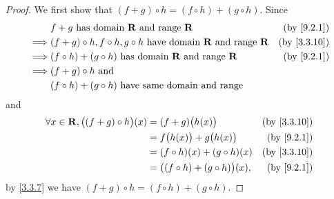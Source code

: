 \begin{proof}
  We first show that \((f + g) \circ h = (f \circ h) + (g \circ h)\).
  Since
  \begin{align*}
             & f + g \text{ has domain } \R \text{ and range } \R                                   & \text{(by \cref{9.2.1})}  \\
    \implies & (f + g) \circ h, f \circ h, g \circ h  \text{ have domain } \R \text{ and range } \R & \text{(by \cref{3.3.10})} \\
    \implies & (f \circ h) + (g \circ h)  \text{ has domain } \R \text{ and range } \R              & \text{(by \cref{9.2.1})}  \\
    \implies & (f + g) \circ h \text{ and }                                                                                     \\
             & (f \circ h) + (g \circ h) \text{ have same domain and range}
  \end{align*}
  and
  \begin{align*}
    \forall x \in \R, \big((f + g) \circ h\big)(x) & = (f + g)\big(h(x)\big)                   & \text{(by \cref{3.3.10})} \\
                                                   & = f\big(h(x)\big) + g\big(h(x)\big)       & \text{(by \cref{9.2.1})}  \\
                                                   & = (f \circ h)(x) + (g \circ h)(x)         & \text{(by \cref{3.3.10})} \\
                                                   & = \big((f \circ h) + (g \circ h)\big)(x), & \text{(by \cref{9.2.1})}
  \end{align*}
  by \cref{3.3.7} we have \((f + g) \circ h = (f \circ h) + (g \circ h)\).


\end{proof}

